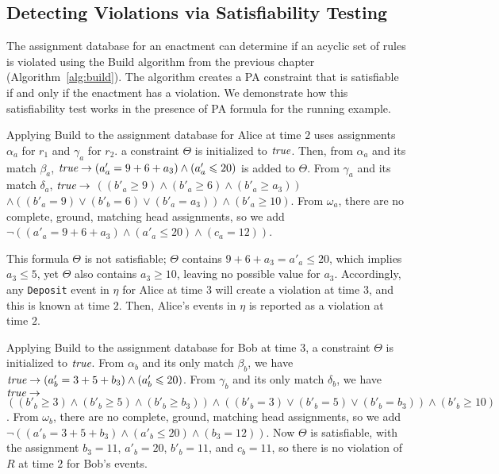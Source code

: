 \subsection{Detecting Violations via Satisfiability Testing}

The assignment database
for an enactment
can determine
if an acyclic set of rules
is violated using
the {\sf Build} algorithm
from the previous chapter (Algorithm~\ref{alg:build}).
The algorithm
creates a PA constraint
that is satisfiable if and only if 
the enactment has a violation.
We demonstrate how this satisfiability test
works in the presence of PA formula for the running example.

\begin{examp}\label{ex:aggregation-build-sat}
Applying {\sf Build} to the assignment database
for \mbox{Alice} at time $2$
uses assignments $\alpha_a$ for $r_1$
and $\gamma_a$ for $r_2$.
a constraint $\Theta$ is initialized to $\mbox{\em true}$.
Then, from $\alpha_a$ and its match $\beta_a$,
$\mbox{\em true}\rightarrow (a'_a = 9 + 6 + a_3) \land (a'_a \leq 20)$ is added to $\Theta$.
From $\gamma_a$ and its match $\delta_a$,
$\mbox{\em true}\rightarrow$ $((b'_a \geq 9) \land (b'_a \geq 6) \land (b'_a \geq a_3))$ 
$\land ((b'_a=9) \lor (b'_b=6) \lor (b'_a=a_3)) \land (b'_a \geq 10)$.
From $\omega_a$, there are no complete, ground, matching head assignments, so we add
$\neg((a'_a = 9 + 6 + a_3) \land (a'_a \leq 20) \land (c_a = 12))$.

This formula $\Theta$ is not satisfiable;
$\Theta$ contains
$9 + 6 + a_3 = a'_a \leq 20$,
which implies $a_3 \leq 5$,
yet $\Theta$ also contains
$a_3 \geq 10$,
leaving no possible value for $a_3$.
Accordingly,
any {\tt Deposit} event in $\eta$ for Alice at time $3$
will create a violation at time $3$,
and this is known at time $2$. 
Then, Alice's events in $\eta$ is reported as a violation at time $2$.

Applying {\sf Build} to the assignment database
for \mbox{Bob} at time $3$,
a constraint $\Theta$ is initialized to $\mbox{\em true}$.
From $\alpha_b$ and its only match $\beta_b$,
we have $\mbox{\em true}\rightarrow (a'_b = 3 + 5 + b_3) \land (a'_b \leq 20)$.
From $\gamma_b$ and its only match $\delta_b$,
we have $\mbox{\em true}\rightarrow$ $((b'_b \geq 3) \land (b'_b \geq 5) \land (b'_b \geq b_3))
\land ((b'_b=3) \lor (b'_b=5) \lor (b'_b=b_3)) \land (b'_b \geq 10)$.
From $\omega_b$, there are no complete, ground, matching head assignments, so we add
$\neg((a'_b = 3 + 5 + b_3) \land (a'_b \leq 20) \land (b_3 = 12))$.
Now $\Theta$ is satisfiable, with the assignment $b_3 = 11$, $a'_b = 20$, $b'_b=11$, and $c_b = 11$,
so there is no violation of $R$ at time $2$ for \mbox{Bob}'s events.
\end{examp}

